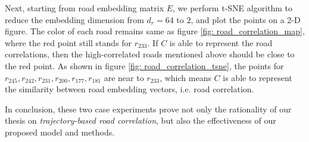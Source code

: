 Next, starting from road embedding matrix $E$, we perform t-SNE\cite{tsne} algorithm to reduce the embedding dimension from $d_r=64$ to $2$, and plot the points on a 2-D figure. The color of each road remains same as figure \ref{fig: road_correlation_map}, where the red point still stands for $r_{233}$. If $C$ is able to represent the road correlations, then the high-correlated roads mentioned above should be close to the red point. As shown in figure \ref{fig: road_correlation_tsne}, the points for $r_{245}, r_{242}, r_{231}, r_{200}, r_{177}, r_{181}$ are near to $r_{233}$, which means $C$ is able to represent the similarity between road embedding vectors, i.e. road correlation.

In conclusion, these two case experiments prove not only the rationality of our thesis on \textit{trajectory-based road correlation}, but also the effectiveness of our proposed model and methods.
